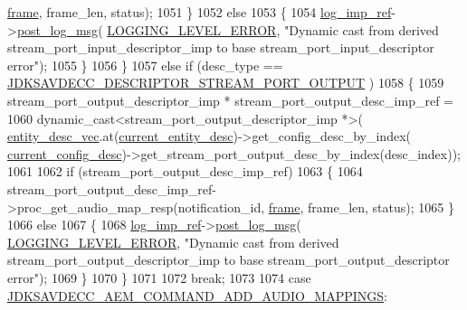 \begin{DoxyCode}
{{      \hyperlink{gst__avb__playbin_8c_ac8e710e0b5e994c0545d75d69868c6f0}{frame}, frame\_len, status);
1051             \}
1052             \textcolor{keywordflow}{else}
1053             \{
1054                 \hyperlink{namespaceavdecc__lib_acbe3e2a96ae6524943ca532c87a28529}{log\_imp\_ref}->\hyperlink{classavdecc__lib_1_1log_a68139a6297697e4ccebf36ccfd02e44a}{post\_log\_msg}(
      \hyperlink{namespaceavdecc__lib_a501055c431e6872ef46f252ad13f85cdaf2c4481208273451a6f5c7bb9770ec8a}{LOGGING\_LEVEL\_ERROR}, \textcolor{stringliteral}{"Dynamic cast from derived stream\_port\_input\_descriptor\_imp to base
       stream\_port\_input\_descriptor error"});
1055             \}
1056         \}
1057         \textcolor{keywordflow}{else} \textcolor{keywordflow}{if} (desc\_type == \hyperlink{group__descriptor_gab28f87a9e7610f8441c1c4840d2c2fb9}{JDKSAVDECC\_DESCRIPTOR\_STREAM\_PORT\_OUTPUT}
      )
1058         \{
1059             stream\_port\_output\_descriptor\_imp * stream\_port\_output\_desc\_imp\_ref =
1060                 \textcolor{keyword}{dynamic\_cast<}stream\_port\_output\_descriptor\_imp *\textcolor{keyword}{>}(
      \hyperlink{classavdecc__lib_1_1end__station__imp_a72edab41bc56e3c1757944a7df188a3d}{entity\_desc\_vec}.at(\hyperlink{classavdecc__lib_1_1end__station__imp_afd78c89df26ba7641e1adb764c0e827d}{current\_entity\_desc})->get\_config\_desc\_by\_index(
      \hyperlink{classavdecc__lib_1_1end__station__imp_a60b1af40d35e8a86b0082c54ab6cb6a8}{current\_config\_desc})->get\_stream\_port\_output\_desc\_by\_index(desc\_index));
1061 
1062             \textcolor{keywordflow}{if} (stream\_port\_output\_desc\_imp\_ref)
1063             \{
1064                 stream\_port\_output\_desc\_imp\_ref->proc\_get\_audio\_map\_resp(notification\_id, 
      \hyperlink{gst__avb__playbin_8c_ac8e710e0b5e994c0545d75d69868c6f0}{frame}, frame\_len, status);
1065             \}
1066             \textcolor{keywordflow}{else}
1067             \{
1068                 \hyperlink{namespaceavdecc__lib_acbe3e2a96ae6524943ca532c87a28529}{log\_imp\_ref}->\hyperlink{classavdecc__lib_1_1log_a68139a6297697e4ccebf36ccfd02e44a}{post\_log\_msg}(
      \hyperlink{namespaceavdecc__lib_a501055c431e6872ef46f252ad13f85cdaf2c4481208273451a6f5c7bb9770ec8a}{LOGGING\_LEVEL\_ERROR}, \textcolor{stringliteral}{"Dynamic cast from derived stream\_port\_output\_descriptor\_imp to
       base stream\_port\_output\_descriptor error"});
1069             \}
1070         \}
1071 
1072         \textcolor{keywordflow}{break};
1073 
1074     \textcolor{keywordflow}{case} \hyperlink{group__command_gac872db287b8e91225b52129c617e1da0}{JDKSAVDECC\_AEM\_COMMAND\_ADD\_AUDIO\_MAPPINGS}:
}}
\end{DoxyCode}

